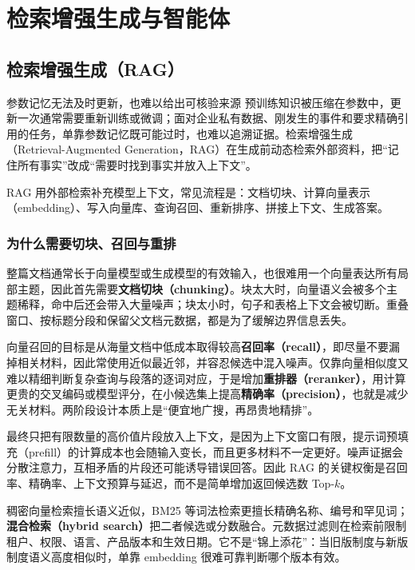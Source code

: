 \part{检索增强生成与智能体}

\chapter{检索增强生成（RAG）}\label{sec:rag}

\begin{motivationbox}{参数记忆无法及时更新，也难以给出可核验来源}
预训练知识被压缩在参数中，更新一次通常需要重新训练或微调；面对企业私有数据、刚发生的事件和要求精确引用的任务，单靠参数记忆既可能过时，也难以追溯证据。检索增强生成（Retrieval-Augmented Generation，RAG）在生成前动态检索外部资料，把“记住所有事实”改成“需要时找到事实并放入上下文”。
\end{motivationbox}

RAG 用外部检索补充模型上下文，常见流程是：文档切块、计算向量表示（embedding）、写入向量库、查询召回、重新排序、拼接上下文、生成答案。

\section{为什么需要切块、召回与重排}

整篇文档通常长于向量模型或生成模型的有效输入，也很难用一个向量表达所有局部主题，因此首先需要\textbf{文档切块（chunking）}。块太大时，向量语义会被多个主题稀释，命中后还会带入大量噪声；块太小时，句子和表格上下文会被切断。重叠窗口、按标题分段和保留父文档元数据，都是为了缓解边界信息丢失。

向量召回的目标是从海量文档中低成本取得较高\textbf{召回率（recall）}，即尽量不要漏掉相关材料，因此常使用近似最近邻，并容忍候选中混入噪声。仅靠向量相似度又难以精细判断复杂查询与段落的逐词对应，于是增加\textbf{重排器（reranker）}，用计算更贵的交叉编码或模型评分，在小候选集上提高\textbf{精确率（precision）}，也就是减少无关材料。两阶段设计本质上是“便宜地广搜，再昂贵地精排”。

最终只把有限数量的高价值片段放入上下文，是因为上下文窗口有限，提示词预填充（prefill）的计算成本也会随输入变长，而且更多材料不一定更好。噪声证据会分散注意力，互相矛盾的片段还可能诱导错误回答。因此 RAG 的关键权衡是召回率、精确率、上下文预算与延迟，而不是简单增加返回候选数 Top-$k$。

稠密向量检索擅长语义近似，BM25 等词法检索更擅长精确名称、编号和罕见词；\textbf{混合检索（hybrid search）}把二者候选或分数融合。元数据过滤则在检索前限制租户、权限、语言、产品版本和生效日期。它不是“锦上添花”：当旧版制度与新版制度语义高度相似时，单靠 embedding 很难可靠判断哪个版本有效。

